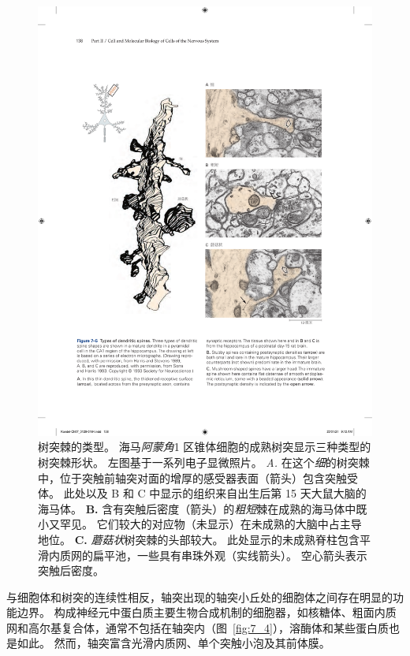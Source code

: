 \begin{figure}[htbp]
	\centering
	\includegraphics[width=1.0\linewidth]{chap07/fig_7_5}
	\caption{树突棘的类型。
		海马\textit{阿蒙角}1 区锥体细胞的成熟树突显示三种类型的树突棘形状。
		左图基于一系列电子显微照片\cite{harris1989dendritic,sorra1993occurrence}。
		\textit{A.} 在这个\textit{细}的树突棘中，位于突触前轴突对面的增厚的感受器表面（箭头）包含突触受体。
		此处以及 B 和 C 中显示的组织来自出生后第 15 天大鼠大脑的海马体。
		\textbf{B.} 含有突触后密度（箭头）的\textit{粗短}棘在成熟的海马体中既小又罕见。
		它们较大的对应物（未显示）在未成熟的大脑中占主导地位。
		\textbf{C.} \textit{蘑菇状}树突棘的头部较大。
		此处显示的未成熟脊柱包含平滑内质网的扁平池，一些具有串珠外观（实线箭头）。
		空心箭头表示突触后密度。}
	\label{fig:7_5}
\end{figure}


与细胞体和树突的连续性相反，轴突出现的轴突小丘处的细胞体之间存在明显的功能边界。
构成神经元中蛋白质主要生物合成机制的细胞器，如核糖体、粗面内质网和高尔基复合体，通常不包括在轴突内（图~\ref{fig:7_4}），溶酶体和某些蛋白质也是如此。
然而，轴突富含光滑内质网、单个突触小泡及其前体膜。



